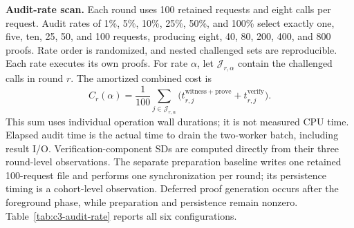 \noindent\textbf{Audit-rate scan.}
Each round uses 100 retained requests and eight calls per request. Audit
rates of 1\%, 5\%, 10\%, 25\%, 50\%, and 100\% select exactly
one, five, ten, 25, 50, and 100 requests, producing eight, 40, 80, 200,
400, and 800 proofs. Rate order is randomized, and nested challenged sets
are reproducible. Each rate executes its own proofs.
For rate $\alpha$, let $\mathcal{J}_{r,\alpha}$ contain the challenged
calls in round $r$. The amortized combined cost is
\[
 C_r(\alpha)=\frac{1}{100}
 \sum_{j\in\mathcal{J}_{r,\alpha}}
 \bigl(t^{\mathrm{witness+prove}}_{r,j}
       +t^{\mathrm{verify}}_{r,j}\bigr).
\]
This sum uses individual operation wall durations; it is not measured CPU
time. Elapsed audit time is the actual time to drain the two-worker batch,
including result I/O. Verification-component SDs are computed directly
from their three round-level observations.
The separate preparation baseline writes one retained 100-request file
and performs one synchronization per round; its persistence timing is a
cohort-level observation. Deferred proof generation occurs after the
foreground phase, while preparation and persistence remain nonzero.
Table~\ref{tab:c3-audit-rate} reports all six configurations.

